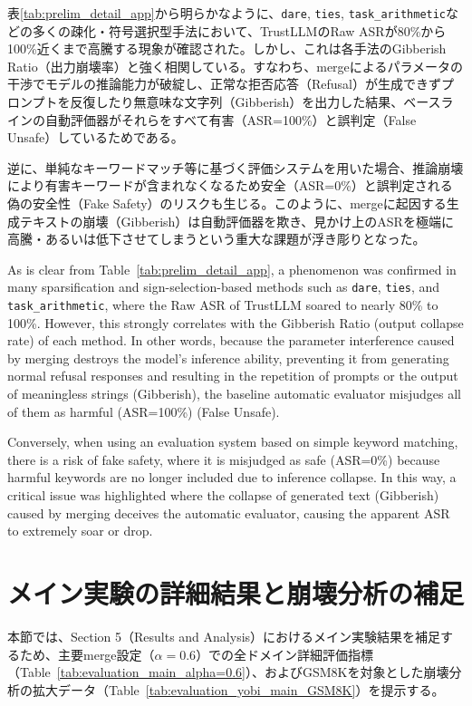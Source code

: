 \documentclass{article}
\begin{document}
表\ref{tab:prelim_detail_app}から明らかなように、\texttt{dare}, \texttt{ties}, \texttt{task\_arithmetic}などの多くの疎化・符号選択型手法において、TrustLLMのRaw ASRが80\%から100\%近くまで高騰する現象が確認された。しかし、これは各手法のGibberish Ratio（出力崩壊率）と強く相関している。すなわち、mergeによるパラメータの干渉でモデルの推論能力が破綻し、正常な拒否応答（Refusal）が生成できずプロンプトを反復したり無意味な文字列（Gibberish）を出力した結果、ベースラインの自動評価器がそれらをすべて有害（ASR=100\%）と誤判定（False Unsafe）しているためである。

逆に、単純なキーワードマッチ等に基づく評価システムを用いた場合、推論崩壊により有害キーワードが含まれなくなるため安全（ASR=0\%）と誤判定される偽の安全性（Fake Safety）のリスクも生じる。このように、mergeに起因する生成テキストの崩壊（Gibberish）は自動評価器を欺き、見かけ上のASRを極端に高騰・あるいは低下させてしまうという重大な課題が浮き彫りとなった。

As is clear from Table~\ref{tab:prelim_detail_app}, a phenomenon was confirmed in many sparsification and sign-selection-based methods such as \texttt{dare}, \texttt{ties}, and \texttt{task\_arithmetic}, where the Raw ASR of TrustLLM soared to nearly 80\% to 100\%. However, this strongly correlates with the Gibberish Ratio (output collapse rate) of each method. In other words, because the parameter interference caused by merging destroys the model's inference ability, preventing it from generating normal refusal responses and resulting in the repetition of prompts or the output of meaningless strings (Gibberish), the baseline automatic evaluator misjudges all of them as harmful (ASR=100\%) (False Unsafe).

Conversely, when using an evaluation system based on simple keyword matching, there is a risk of fake safety, where it is misjudged as safe (ASR=0\%) because harmful keywords are no longer included due to inference collapse. In this way, a critical issue was highlighted where the collapse of generated text (Gibberish) caused by merging deceives the automatic evaluator, causing the apparent ASR to extremely soar or drop.

\section{メイン実験の詳細結果と崩壊分析の補足}
\label{app:メイン実験の詳細結果と崩壊分析の補足}
本節では、Section 5（Results and Analysis）におけるメイン実験結果を補足するため、主要merge設定（$\alpha=0.6$）での全ドメイン詳細評価指標（Table~\ref{tab:evaluation_main_alpha=0.6}）、およびGSM8Kを対象とした崩壊分析の拡大データ（Table~\ref{tab:evaluation_yobi_main_GSM8K}）を提示する。
\end{document}
